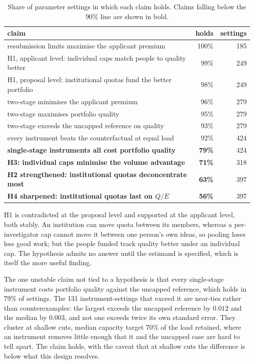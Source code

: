\documentclass[11pt,a4paper]{article}
\begin{document}
\begin{table}[!htbp]
\centering
\small
\caption{Share of parameter settings in which each claim holds. Claims falling
below the 90\% line are shown in bold.}
\label{tab:claims}
\begin{tabular}{lrr}
\toprule
claim & holds & settings \\
\midrule
resubmission limits maximise the applicant premium              & 100\% & 185 \\
H1, applicant level: individual caps match people to quality better & 99\% & 249 \\
H1, proposal level: institutional quotas fund the better portfolio & 98\% & 249 \\
two-stage minimises the applicant premium                       & 96\% & 279 \\
two-stage maximises portfolio quality                           & 95\% & 279 \\
two-stage exceeds the uncapped reference on quality             & 93\% & 279 \\
every instrument beats the counterfactual at equal load         & 92\% & 424 \\
\midrule
\textbf{single-stage instruments all cost portfolio quality}     & \textbf{79\%} & 424 \\
\textbf{H3: individual caps minimise the volume advantage}        & \textbf{71\%} & 318 \\
\textbf{H2 strengthened: institutional quotas deconcentrate most} & \textbf{63\%} & 397 \\
\textbf{H4 sharpened: institutional quotas last on $Q/E$}         & \textbf{56\%} & 397 \\
\bottomrule
\end{tabular}
\end{table}

H1 is contradicted at the proposal level and supported at the applicant level,
both stably. An institution can move quota between its members, whereas a
per-investigator cap cannot move it between one person's own ideas, so pooling
loses less good work; but the people funded track quality better under an
individual cap. The hypothesis admits no answer until the estimand is
specified, which is itself the more useful finding.

The one unstable claim not tied to a hypothesis is that every single-stage
instrument costs portfolio quality against the uncapped reference, which holds in
79\% of settings. The 131 instrument-settings that exceed it are near-ties rather than
counterexamples:
the largest exceeds the uncapped reference by $0.012$ and the median by $0.003$,
and not one exceeds twice its own standard error. They cluster at shallow cuts,
median capacity target 70\% of the load retained, where an instrument removes
little enough that it and the uncapped case are hard to tell apart. The claim
holds, with the caveat that at shallow cuts the difference is below what this
design resolves.
\end{document}
